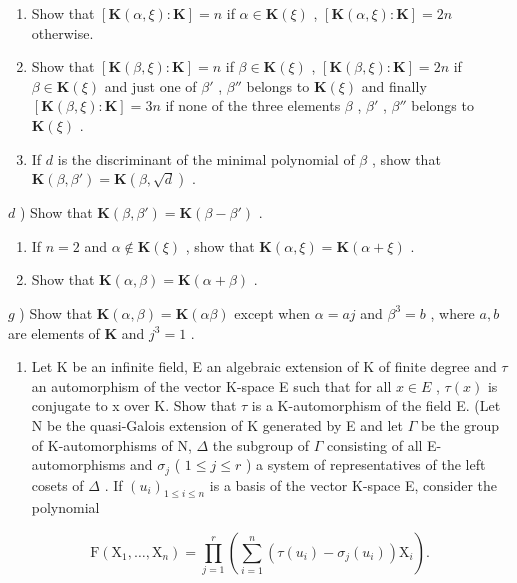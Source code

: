 \begin{enumerate}
\def\labelenumi{\alph{enumi})}
\item
  Show that \([\mathbf{K}(\alpha, \xi): \mathbf{K}] = n\) if \(\alpha \in \mathbf{K}(\xi)\) , \([\mathbf{K}(\alpha, \xi): \mathbf{K}] = 2n\) otherwise.
\item
  Show that \([\mathbf{K}(\beta,\xi):\mathbf{K}]=n\) if \(\beta\in\mathbf{K}(\xi)\) , \([\mathbf{K}(\beta,\xi):\mathbf{K}]=2n\) if \(\beta\in\mathbf{K}(\xi)\) and just one of \(\beta'\) , \(\beta''\) belongs to \(\mathbf{K}(\xi)\) and finally \([\mathbf{K}(\beta,\xi):\mathbf{K}]=3n\) if none of the three elements \(\beta\) , \(\beta'\) , \(\beta''\) belongs to \(\mathbf{K}(\xi)\) .
\item
  If \(d\) is the discriminant of the minimal polynomial of \(\beta\) , show that \(\mathbf{K}(\beta, \beta') = \mathbf{K}(\beta, \sqrt{d})\) .
\end{enumerate}

\(d\) ) Show that \(\mathbf{K}(\beta, \beta') = \mathbf{K}(\beta - \beta')\) .

\begin{enumerate}
\def\labelenumi{\alph{enumi})}
\setcounter{enumi}{4}
\item
  If \(n = 2\) and \(\alpha \notin \mathbf{K}(\xi)\) , show that \(\mathbf{K}(\alpha, \xi) = \mathbf{K}(\alpha + \xi)\) .
\item
  Show that \(\mathbf{K}(\alpha, \beta) = \mathbf{K}(\alpha + \beta)\) .
\end{enumerate}

\(g\) ) Show that \(\mathbf{K}(\alpha ,\beta) = \mathbf{K}(\alpha \beta)\) except when \(\alpha = aj\) and \(\beta^3 = b\) , where \(a,b\) are elements of \(\mathbf{K}\) and \(j^3 = 1\) .

\begin{enumerate}
\def\labelenumi{\arabic{enumi})}
\setcounter{enumi}{7}
\tightlist
\item
  Let K be an infinite field, E an algebraic extension of K of finite degree and \(\tau\) an automorphism of the vector K-space E such that for all \(x \in E\) , \(\tau(x)\) is conjugate to x over K. Show that \(\tau\) is a K-automorphism of the field E. (Let N be the quasi-Galois extension of K generated by E and let \(\Gamma\) be the group of K-automorphisms of N, \(\Delta\) the subgroup of \(\Gamma\) consisting of all E-automorphisms and \(\sigma_{j}\) ( \(1 \leqslant j \leqslant r\) ) a system of representatives of the left cosets of \(\Delta\) . If \((u_{i})_{1 \leqslant i \leqslant n}\) is a basis of the vector K-space E, consider the polynomial
\end{enumerate}

\[
\mathrm{F} \left(\mathrm{X} _ {1}, \dots , \mathrm{X} _ {n}\right) = \prod_ {j = 1} ^ {r} \left(\sum_ {i = 1} ^ {n} \left(\tau \left(u _ {i}\right) - \sigma_ {j} \left(u _ {i}\right)\right) \mathrm{X} _ {i}\right).
\]

